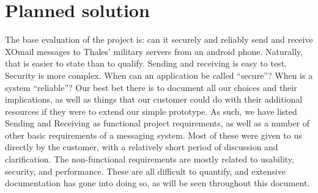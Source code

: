 \section{Planned solution}

The base evaluation of the project is: can it securely and reliably send and receive XOmail messages to Thales’ military servers from an android phone. Naturally, that is easier to state than to qualify. 
\newline
\newline
Sending and receiving is easy to test. Security is more complex. When can an application be called “secure”? When is a system “reliable”? Our best bet there is to document all our choices and their implications, as well as things that our customer could do with their additional resources if they were to extend our simple prototype. 
\newline
\newline
As such, we have listed Sending and Receiving as functional project requirements, as well as a number of other basic requirements of a messaging system. Most of these were given to us directly by the customer, with a relatively short period of discussion and clarification. 
\newline
\newline
The non-functional requirements are mostly related to usability, security, and performance. These are all difficult to quantify, and extensive documentation has gone into doing so, as will be seen throughout this document. 